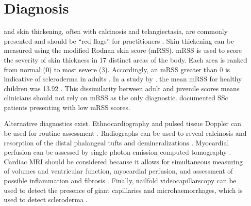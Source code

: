 \section{Diagnosis}
\label{diagnosis}

\Rp and skin thickening, often with calcinosis and
telangiectasia, are commonly presented and should be ``red flags'' for
practitioners \citep{redflags,abbasi}. Skin thickening can be measured using
the modified Rodnan skin score (mRSS). mRSS is used to score the severity of
skin thickness in 17 distinct areas of the body. Each area is ranked from
normal (0) to most severe (3). Accordingly, an mRSS greater than 0 is
indicative of scleroderma in adults \citep{eurostar}. In a study by
\citeauthor{foeldvari}, the mean mRSS for healthy children was 13.92
\citep{foeldvari}. This dissimilarity between adult and juvenile scores means
clinicians should not rely on mRSS as the only diagnostic.
\citeauthor{hanitsch} documented SSc patients presenting with low mRSS scores.

Alternative diagnostics exist. Ethnocardiography and pulsed tissue Doppler can
be used for routine assessment \citep{allanore}.  Radiographs can be used to
reveal calcinosis and resorption of the distal phalangeal tufts and
demineralizations \citep{overviewSSc}. Myocardial perfusion can be assessed by
single photon emission computed tomography \citep{allanore,mele}. Cardiac MRI
should be considered because it allows for simultaneous measuring of volumes
and ventricular function, myocardial perfusion, and assessment of possible
inflammation and fibrosis \citep{allanore}. Finally, nailfold
videocapillarscopy can be used to detect the presence of giant capillaries and
microhaemorrhages, which is used to detect scleroderma \citep{cutulo}.


